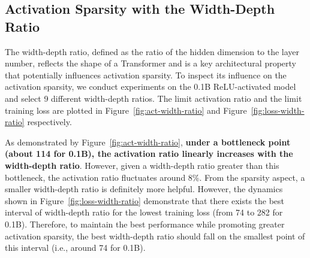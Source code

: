 \documentclass{article} %
\begin{document}

\subsection{Activation Sparsity with the Width-Depth Ratio} \label{sec:width-depth}

The width-depth ratio, defined as the ratio of the hidden dimension to the layer number, reflects the shape of a Transformer and is a key architectural property that potentially influences activation sparsity. To inspect its influence on the activation sparsity, we conduct experiments on the 0.1B ReLU-activated model and select 9 different width-depth ratios. The limit activation ratio and the limit training loss are plotted in Figure~\ref{fig:act-width-ratio} and Figure~\ref{fig:loss-width-ratio} respectively.

As demonstrated by Figure~\ref{fig:act-width-ratio}, \textbf{under a bottleneck point (about 114 for 0.1B), the activation ratio linearly increases with the width-depth ratio}. However, given a width-depth ratio greater than this bottleneck, the activation ratio fluctuates around 8\%. From the sparsity aspect, a smaller width-depth ratio is definitely more helpful. However, the dynamics shown in Figure~\ref{fig:loss-width-ratio} demonstrate that there exists the best interval of width-depth ratio for the lowest training loss (from 74 to 282 for 0.1B). Therefore, to maintain the best performance while promoting greater activation sparsity, the best width-depth ratio should fall on the smallest point of this interval (i.e., around 74 for 0.1B).
\end{document}
